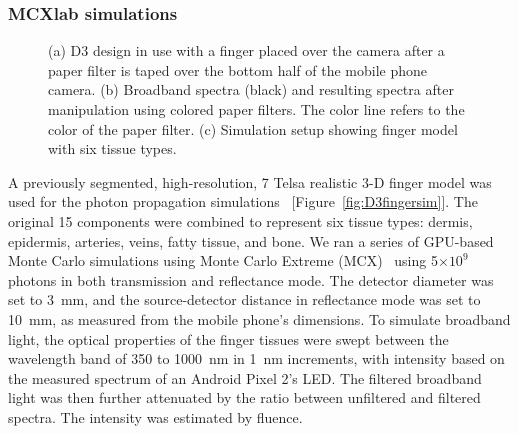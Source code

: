 \subsubsection{MCXlab simulations}
\begin{figure}
    \begin{center}
    \end{center}
    \caption{(a) D3 design in use with a finger placed over the camera after a paper filter is taped over the bottom half of the mobile phone camera. (b) Broadband spectra (black) and resulting spectra after manipulation using colored paper filters. The color line refers to the color of the paper filter. (c) Simulation setup showing finger model with six tissue types.} 
    \label{fig:D3simulations}
\end{figure} 
A previously segmented, high-resolution, 7 Telsa realistic 3-D finger model was used for the photon propagation simulations~\cite{Laistler2018} [Figure~\ref{fig:D3fingersim}]. The original 15 components were combined to represent six tissue types: dermis, epidermis, arteries, veins, fatty tissue, and bone. We ran a series of GPU-based Monte Carlo simulations using Monte Carlo Extreme (MCX)~\cite{Fang2009b} using 5$\times 10^9$ photons in both transmission and reflectance mode. The detector diameter was set to 3~mm, and the source-detector distance in reflectance mode was set to 10~mm, as measured from the mobile phone's dimensions. To simulate broadband light, the optical properties of the finger tissues were swept between the wavelength band of 350 to 1000~nm in 1~nm increments, with intensity based on the measured spectrum of an Android Pixel 2's LED. The filtered broadband light was then further attenuated by the ratio between unfiltered and filtered spectra. The intensity was estimated by fluence.  
        
